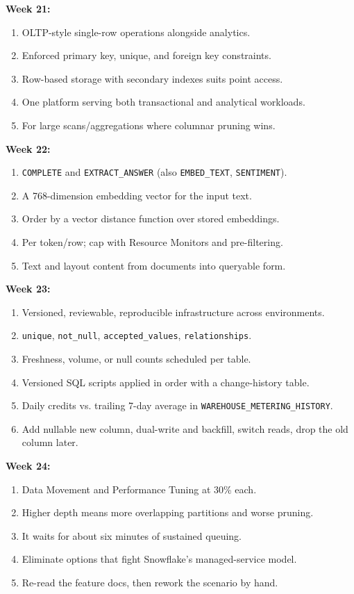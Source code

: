 \documentclass[11pt, a4paper]{article}
\begin{document}
\noindent\textbf{Week 21:}
\begin{enumerate}[nosep, leftmargin=6mm]
    \item OLTP-style single-row operations alongside analytics.
    \item Enforced primary key, unique, and foreign key constraints.
    \item Row-based storage with secondary indexes suits point access.
    \item One platform serving both transactional and analytical workloads.
    \item For large scans/aggregations where columnar pruning wins.
\end{enumerate}
\noindent\textbf{Week 22:}
\begin{enumerate}[nosep, leftmargin=6mm]
    \item \texttt{COMPLETE} and \texttt{EXTRACT\_ANSWER} (also \texttt{EMBED\_TEXT}, \texttt{SENTIMENT}).
    \item A 768-dimension embedding vector for the input text.
    \item Order by a vector distance function over stored embeddings.
    \item Per token/row; cap with Resource Monitors and pre-filtering.
    \item Text and layout content from documents into queryable form.
\end{enumerate}
\noindent\textbf{Week 23:}
\begin{enumerate}[nosep, leftmargin=6mm]
    \item Versioned, reviewable, reproducible infrastructure across environments.
    \item \texttt{unique}, \texttt{not\_null}, \texttt{accepted\_values}, \texttt{relationships}.
    \item Freshness, volume, or null counts scheduled per table.
    \item Versioned SQL scripts applied in order with a change-history table.
    \item Daily credits vs. trailing 7-day average in \texttt{WAREHOUSE\_METERING\_HISTORY}.
    \item Add nullable new column, dual-write and backfill, switch reads, drop the old column later.
\end{enumerate}
\noindent\textbf{Week 24:}
\begin{enumerate}[nosep, leftmargin=6mm]
    \item Data Movement and Performance Tuning at 30\% each.
    \item Higher depth means more overlapping partitions and worse pruning.
    \item It waits for about six minutes of sustained queuing.
    \item Eliminate options that fight Snowflake's managed-service model.
    \item Re-read the feature docs, then rework the scenario by hand.
\end{enumerate}
\end{document}
